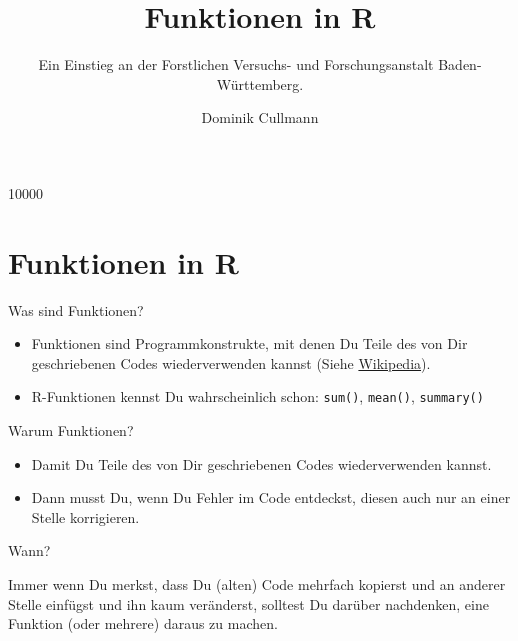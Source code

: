  10000
\raggedbottom

\AtBeginPart{
  \let\insertpartnumber\relax
  \let\partname\relax
  \frame{\partpage}
}
\AtBeginSection{
  \ifbibliography
  \else
    \let\insertsectionnumber\relax
    \let\sectionname\relax
    \frame{\sectionpage}
  \fi
}
\AtBeginSubsection{
  \let\insertsubsectionnumber\relax
  \let\subsectionname\relax
  \frame{\subsectionpage}
}

\setlength{\emergencystretch}{3em}  %
\providecommand{\tightlist}{%
  \setlength{\itemsep}{0pt}\setlength{\parskip}{0pt}}
\setcounter{secnumdepth}{0}

\title{Funktionen in \textbf{R}}
\subtitle{Ein Einstieg an der Forstlichen Versuchs- und Forschungsanstalt
Baden-Württemberg.}
\author{Dominik Cullmann}
\date{}


\frame{\titlepage}

\section{Funktionen in R}\label{funktionen-in-r}

\begin{frame}[fragile]{Was sind Funktionen?}

\begin{itemize}
\tightlist
\item
  Funktionen sind Programmkonstrukte, mit denen Du Teile des von Dir
  geschriebenen Codes wiederverwenden kannst (Siehe
  \href{https://de.wikipedia.org/wiki/Funktion_(Programmierung)}{Wikipedia}).
\item
  R-Funktionen kennst Du wahrscheinlich schon: \texttt{sum()},
  \texttt{mean()}, \texttt{summary()}
\end{itemize}

\end{frame}

\begin{frame}{Warum Funktionen?}

\begin{itemize}
\tightlist
\item
  Damit Du Teile des von Dir geschriebenen Codes wiederverwenden kannst.
\item
  Dann musst Du, wenn Du Fehler im Code entdeckst, diesen auch nur an
  einer Stelle korrigieren.
\end{itemize}

\begin{block}{Wann?}

Immer wenn Du merkst, dass Du (alten) Code mehrfach kopierst und an
anderer Stelle einfügst und ihn kaum veränderst, solltest Du darüber
nachdenken, eine Funktion (oder mehrere) daraus zu machen.

\end{block}

\end{frame}

